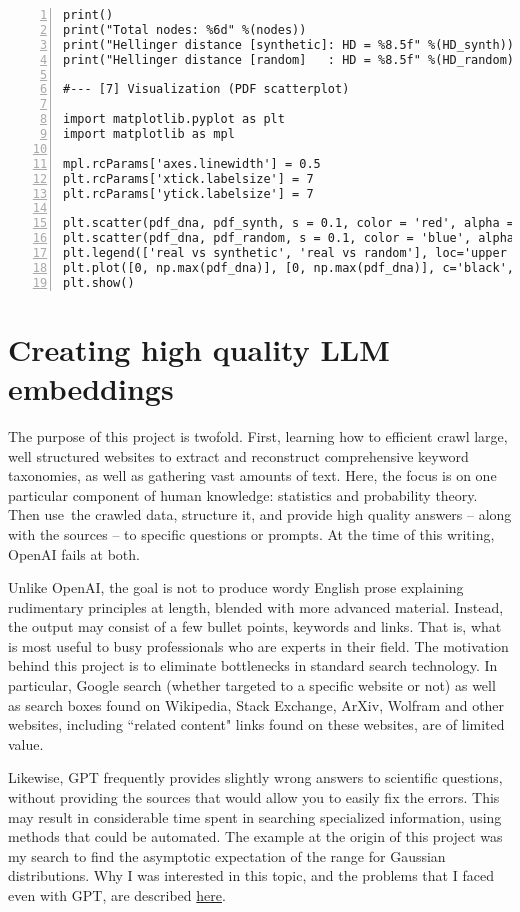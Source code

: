 \documentclass[oneside,10pt]{book}
\begin{document}
\begin{lstlisting}[numbers=left]
print()
print("Total nodes: %6d" %(nodes))
print("Hellinger distance [synthetic]: HD = %8.5f" %(HD_synth))
print("Hellinger distance [random]   : HD = %8.5f" %(HD_random))

#--- [7] Visualization (PDF scatterplot)

import matplotlib.pyplot as plt
import matplotlib as mpl

mpl.rcParams['axes.linewidth'] = 0.5
plt.rcParams['xtick.labelsize'] = 7
plt.rcParams['ytick.labelsize'] = 7

plt.scatter(pdf_dna, pdf_synth, s = 0.1, color = 'red', alpha = 0.5)
plt.scatter(pdf_dna, pdf_random, s = 0.1, color = 'blue', alpha = 0.5)
plt.legend(['real vs synthetic', 'real vs random'], loc='upper left', prop={'size': 7}, )
plt.plot([0, np.max(pdf_dna)], [0, np.max(pdf_dna)], c='black', linewidth = 0.3)
plt.show()
\end{lstlisting}

\section{Creating high quality LLM embeddings}\label{sxllm5}

The purpose of this project is twofold. First, learning how to efficient crawl large, well structured websites to extract and reconstruct comprehensive keyword taxonomies, as well as gathering vast amounts of text. Here, the focus is on one particular component of human knowledge: statistics and probability theory. Then use~the crawled data, structure it, and provide high quality answers -- along with the sources -- to specific questions or prompts. At the time of this writing, OpenAI fails at both.

Unlike \textcolor{index}{OpenAI}, the goal is not to produce wordy English prose explaining rudimentary principles at length, blended with more advanced material. Instead, the output may consist of a few bullet points, keywords and links. That is, what is most useful to busy professionals 
who are  experts in their field. The motivation behind this project is to eliminate bottlenecks in standard search technology. In 
 particular, Google search (whether targeted to a specific website or not) as well as search boxes found on Wikipedia, Stack Exchange, ArXiv, Wolfram and other websites, including ``related content" links found on these websites, are of limited value. 

Likewise, \textcolor{index}{GPT} frequently provides slightly wrong answers to scientific questions, without providing the sources that would allow you to easily fix the errors. This may result in considerable time spent in searching specialized information, using methods that could be automated. The example at the origin of this project was my search to find the asymptotic expectation of the range for Gaussian distributions. Why I was interested in this topic, and the problems that I faced even with GPT, are described \href{https://mltblog.com/3GStuLc}{here}. 
\vspace{1ex}
\end{document}
